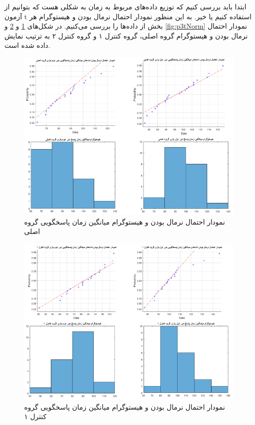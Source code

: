 \documentclass[twoside, a4paper,11pt]{book}
\numberwithin{equation}{chapter}
\numberwithin{table}{chapter}
\numberwithin{figure}{chapter}
\numberwithin{equation}{chapter}
\begin{document}
ابتدا باید بررسی کنیم که توزیع داده‌های مربوط به زمان به شکلی هست که بتوانیم از آزمون t استفاده کنیم یا خیر. به این منظور نمودار احتمال نرمال بودن و هیستوگرام هر بخش از داده‌ها را بررسی می‌کنیم. در شکل‌های \ref{fig:p1tNorm} و \ref{fig:p2tNorm} و \ref{fig:p3tNorm} نمودار احتمال نرمال بودن و هیستوگرام گروه اصلی، گروه کنترل ۱ و گروه کنترل ۲ به ترتیب نمایش داده شده است.

\begin{figure}
\centering
\includegraphics[scale=0.5]{Figures/p1tNorm.png}
\caption{\label{fig:p1tNorm}
نمودار احتمال نرمال بودن و هیستوگرام میانگین زمان پاسخگویی گروه اصلی
}
\end{figure}

\begin{figure}
\centering
\includegraphics[scale=0.5]{Figures/p2tNorm.png}
\caption{\label{fig:p2tNorm}
نمودار احتمال نرمال بودن و هیستوگرام میانگین زمان پاسخگویی گروه کنترل ۱
}
\end{figure}
\end{document}
